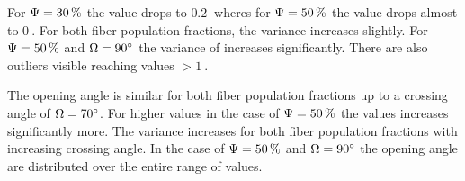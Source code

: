 For $\textnormal{$\Psi$} = \SI{30}{\percent}$ the \trel{} value drops to $\SI{0.2}{}$ wheres for $\textnormal{$\Psi$} = \SI{50}{\percent}$ the \trel{} value drops almost to $\SI{0}{}$.
For both fiber population fractions, the variance increases slightly.
For $\textnormal{$\Psi$} = \SI{50}{\percent}$ and $\textnormal{$\Omega$} = \SI{90}{\degree}$ the variance of \trel{} increases significantly.
There are also outliers visible reaching \trel{} values $>\SI{1}{}$.
\par
The opening angle \openingAngle{} is similar for both fiber population fractions up to a crossing angle of $\textnormal{$\Omega$}=\SI{70}{\degree}$.
For higher values in the case of $\textnormal{$\Psi$} = \SI{50}{\percent}$ the values increases significantly more.
The variance increases for both fiber population fractions with increasing crossing angle.
In the case of $\textnormal{$\Psi$} = \SI{50}{\percent}$ and $\textnormal{$\Omega$} = \SI{90}{\degree}$ the opening angle are distributed over the entire range of values.
%
% 
%
